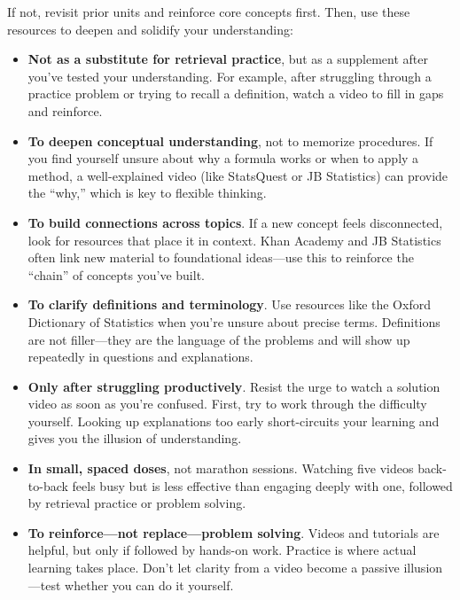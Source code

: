 \documentclass[12pt]{article}
\begin{document}
If not, revisit prior units and reinforce core concepts first. Then, use these resources to deepen and solidify your understanding:
\begin{itemize}
    \item \textbf{Not as a substitute for retrieval practice}, but as a supplement after you've tested your understanding. For example, after struggling through a practice problem or trying to recall a definition, watch a video to fill in gaps and reinforce.
    
    \item \textbf{To deepen conceptual understanding}, not to memorize procedures. If you find yourself unsure about why a formula works or when to apply a method, a well-explained video (like StatsQuest or JB Statistics) can provide the “why,” which is key to flexible thinking.

    \item \textbf{To build connections across topics}. If a new concept feels disconnected, look for resources that place it in context. Khan Academy and JB Statistics often link new material to foundational ideas—use this to reinforce the “chain” of concepts you’ve built.

    \item \textbf{To clarify definitions and terminology}. Use resources like the Oxford Dictionary of Statistics when you're unsure about precise terms. Definitions are not filler—they are the language of the problems and will show up repeatedly in questions and explanations.

    \item \textbf{Only after struggling productively}. Resist the urge to watch a solution video as soon as you’re confused. First, try to work through the difficulty yourself. Looking up explanations too early short-circuits your learning and gives you the illusion of understanding.

    \item \textbf{In small, spaced doses}, not marathon sessions. Watching five videos back-to-back feels busy but is less effective than engaging deeply with one, followed by retrieval practice or problem solving.

    \item \textbf{To reinforce—not replace—problem solving}. Videos and tutorials are helpful, but only if followed by hands-on work. Practice is where actual learning takes place. Don’t let clarity from a video become a passive illusion—test whether you can do it yourself.
\end{itemize}
\end{document}
